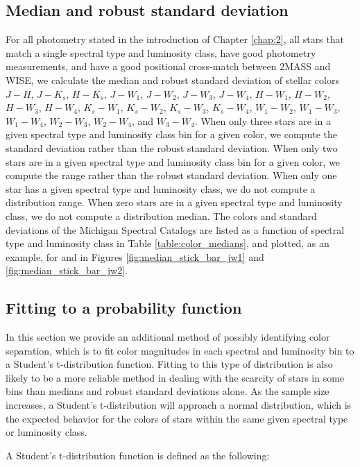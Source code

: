 \subsection{Median and robust standard deviation} \label{subsec:median_stats}
For all photometry stated in the introduction of Chapter \ref{chap:2}, all stars that match a single spectral type and luminosity class, have good photometry measurements, and have a good positional cross-match between 2MASS and WISE, we calculate the median and robust standard deviation of stellar colors $J-H$, $J-K_{s}$, $H-K_{s}$, $J-W_{1}$, $J-W_{2}$, $J-W_{3}$, $J-W_{4}$, $H-W_{1}$, $H-W_{2}$, $H-W_{3}$, $H-W_{4}$, $K_{s}-W_{1}$, $K_{s}-W_{2}$, $K_{s}-W_{3}$, $K_{s}-W_{4}$, $W_{1}-W_{2}$, $W_{1}-W_{3}$, $W_{1}-W_{4}$, $W_{2}-W_{3}$, $W_{2}-W_{4}$, and $W_{3}-W_{4}$. When only three stars are in a given spectral type and luminosity class bin for a given color, we compute the standard deviation rather than the robust standard deviation.  When only two stars are in a given spectral type and luminosity class bin for a given color, we compute the range rather than the robust standard deviation.  When only one star has a given spectral type and luminosity class, we do not compute a distribution range.  When zero stars are in a given spectral type and luminosity class, we do not compute a distribution median.  The colors and standard deviations of the Michigan Spectral Catalogs are listed as a function of spectral type and luminosity class in Table \ref{table:color_medians}, and plotted, as an example, for \jwone and \jwtwo in Figures \ref{fig:median_stick_bar_jw1} and \ref{fig:median_stick_bar_jw2}.

\subsection{Fitting to a probability function} \label{subsec:tdist_stats}
In this section we provide an additional method of possibly identifying color separation, which is to fit color magnitudes in each spectral and luminosity bin to a Student's t-distribution function. Fitting to this type of distribution is also likely to be a more reliable method in dealing with the scarcity of stars in some bins than medians and robust standard deviations alone. As the sample size increases, a Student's t-distribution will approach a normal distribution, which is the expected behavior for the colors of stars within the same given spectral type or luminosity class.

A Student's t-distribution function is defined as the following:

